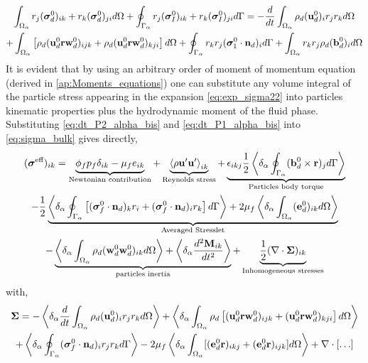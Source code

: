 \begin{multline}
    \int_{\Omega_\alpha}  r_{j}(\bm{\sigma}^0_d)_{ik}+r_{k}(\bm{\sigma}^0_d)_{ji} d\Omega
    +\oint_{\Gamma_\alpha}  r_{j}(\bm{\sigma}^0_I)_{ik}+r_{k}(\bm{\sigma}_I^0)_{ji} d\Gamma
    = 
    - \frac{d}{dt}\int_{\Omega_\alpha}  \rho_d (\textbf{u}_d^0)_i r_j r_k  d\Omega
    \\
    + \int_{\Omega_\alpha}  \left[
        \rho_d (\textbf{u}^0_d\textbf{r}\textbf{w}_d^0)_{ijk} + \rho_d (\textbf{u}^0_d\textbf{r}\textbf{w}_d^0)_{kji}
    \right] d\Omega
    +\oint_{\Gamma_\alpha}   r_{k}r_{j} (\bm{\sigma}_1^0\cdot\textbf{n}_d)_i  d\Gamma
    + \int_{\Omega_\alpha}  r_{k}r_{j}  \rho_d (\textbf{b}_d^0)_i  d\Omega 
    \label{eq:dt_P2_alpha_bis}
\end{multline}
It is evident that by using an arbitrary order of moment of momentum equation (derived in \ref{ap:Moments_equations}) one can substitute any volume integral of the particle stress appearing in the expansion \ref{eq:exp_sigma22} into particles kinematic properties plus the hydrodynamic moment of the fluid phase. 
Substituting \ref{eq:dt_P2_alpha_bis} and \ref{eq:dt_P1_alpha_bis} into \ref{eq:sigma_bulk} gives directly, 
\begin{multline}
    (\bm{\sigma}^\text{eff})_{ik}
    = 
    \underbrace{
        \phi_f p_f 
    \delta_{ik}
    - \mu_f e_{ik} 
    }_\text{Newtonian contribution}
    + \underbrace{\left<\rho\textbf{u}'\textbf{u}'\right>_{ik}}_\text{Reynolds stress}
    + \underbrace{\epsilon_{ikj} \frac{1}{2}\left<\delta_\alpha \oint_{\Gamma_\alpha}  (\textbf{b}_d^0 \times \textbf{r})_j d\Gamma\right>}_\text{Particles body torque}\\
    - \frac{1}{2}\underbrace{\left<\delta_\alpha \oint_{\Gamma_\alpha} \left[
        (\bm{\sigma}_f^0 \cdot \textbf{n}_d)_kr_i  
        + (\bm{\sigma}_f^0 \cdot \textbf{n}_d)_i r_k
    \right] d\Gamma\right>
    + 2 \mu_f \left<\delta_\alpha \int_{\Omega_\alpha} (\textbf{e}_d^0)_{ik} d\Omega\right>}_\text{Averaged Stresslet}\\
    - \underbrace{\left<\delta_\alpha \int_{\Omega_\alpha}  \rho_d (\textbf{w}_d^0\textbf{w}_d^0  )_{ik} d\Omega\right>
    + \left<\delta_\alpha \frac{d^2 \textbf{M}_{ik}}{dt^2}  \right>}_\text{particles inertia}
    + \underbrace{\frac{1}{2} (\mathbf{\nabla}\cdot\bm{\Sigma})_{ik}}_\text{Inhomogeneous stresses}
    \label{eq:stress_bulk_explicit}
\end{multline}
with,
\begin{multline}
    \bm{\Sigma}
    = 
    - \left<\delta_\alpha \frac{d}{dt}\int_{\Omega_\alpha}  \rho_d (\textbf{u}_d^0)_i r_j r_k  d\Omega\right>
    + \left<\delta_\alpha \int_{\Omega_\alpha}  
        \rho_d \left[
        (\textbf{u}^0_d\textbf{r}\textbf{w}_d^0)_{ijk} +  (\textbf{u}^0_d\textbf{r}\textbf{w}_d^0)_{kji}
    \right]
     d\Omega\right>\nonumber\\
    +\left<\delta_\alpha \oint_{\Gamma_\alpha}   (\bm{\sigma}_f^0 \cdot \textbf{n}_d)_i r_{j}  r_{k}   d\Gamma\right>
    - 2 \mu_f \left<\delta_\alpha \int_{\Omega_\alpha} [( \textbf{e}_d^0 \textbf{r})_{ikj}
    + ( \textbf{e}_d^0 \textbf{r})_{ijk}] d\Omega\right> + \mathbf{\nabla}\cdot[\ldots]
    \label{eq:Sigma_inhomo}
\end{multline}
